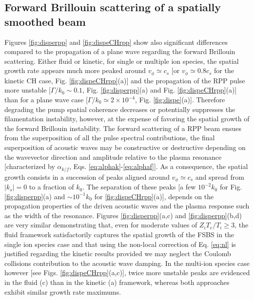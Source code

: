 \documentclass[
 reprint,
 superscriptaddress,
 amsmath,amssymb,
 aps,
]{revtex4-1}
\begin{document}
\subsection{Forward Brillouin scattering of a  spatially smoothed beam}
Figures \ref{fig:disperpp} and \ref{fig:dispeCHrpp} show also significant differences compared to the propagation of a plane wave  regarding the forward Brillouin scattering.  
Either fluid or kinetic, for single or multiple ion species, 
the spatial growth rate appears much more peaked around $v_\phi\simeq c_s$ [or $v_\phi\simeq 0.8c_s$ for  the kinetic CH case, Fig. \ref{fig:dispeCHrpp}(a)] and the propagation of the RPP pulse more unstable  [$\Gamma/k_0\sim 0.1$, Fig.  \ref{fig:disperpp}(a) and Fig.  \ref{fig:dispeCHrpp}(a)]  than for a plane wave case  [$\Gamma/k_0\simeq 2 \times 10^{-4}$, Fig.  \ref{fig:dispe}(a)].
Therefore degrading the pump spatial coherence decreases or potentially suppresses the filamentation instability, however, at the expense of favoring the  spatial growth of the forward Brillouin instability.
The forward scattering of a RPP beam ensues from the superposition of all the pulse spectral contributions, the final superposition of acoustic waves may be constructive or destructive depending on the wavevector direction and amplitude relative to the plasma resonance [characterized by $\alpha_{k/f}$, Eqs. \eqref{eq:alphak}-\eqref{eq:alphaf}]. 
As a consequence, the spatial growth consists in a succession of peaks aligned around $v_\phi\simeq c_s$ and spread from $\vert k_s\vert=0$ to a fraction of $k_0$. The separation of these peaks [a few $ 10^{-2}k_0$ for Fig. \ref{fig:disperpp}(a) and $\sim 10^{-1}k_0$ for \ref{fig:dispeCHrpp}(a)], depends on the propagation properties of the driven acoustic waves and the plasma response such as the width of the resonance. 
Figures \ref{fig:disperpp}(a,c) and  \ref{fig:disperpp}(b,d) are very similar demonstrating that, even for moderate values of $Z_iT_e/T_i\ge3$, the fluid framework satisfactorily captures the spatial growth of the FSBS in the single ion species case and that using the non-local correction of Eq. \eqref{eq:nl} is justified regarding the kinetic results provided we may neglect the Coulomb collisions contribution to the acoustic wave damping.
In the multi-ion species case however [see Figs. \ref{fig:dispeCHrpp}(a,c)],
twice more unstable peaks are evidenced in the fluid  (c) than in the kinetic (a) framework, whereas both approaches exhibit  similar growth rate maximums. 
\end{document}
